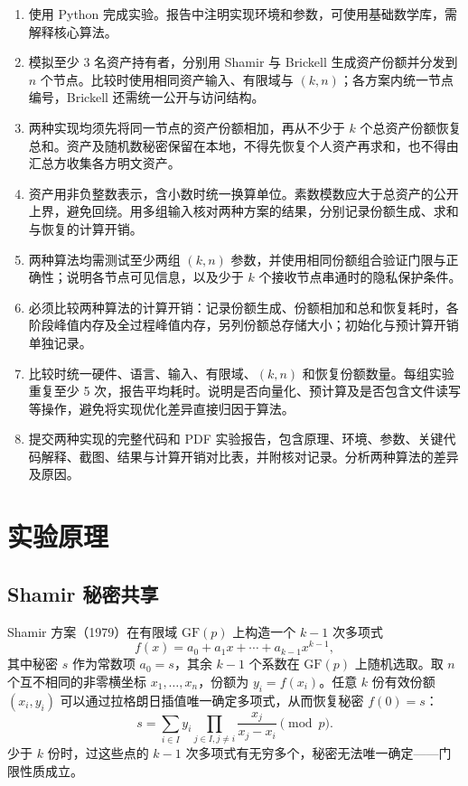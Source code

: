 \documentclass{SYSUReport}
\begin{document}
\begin{enumerate}
    \item 使用 Python 完成实验。报告中注明实现环境和参数，可使用基础数学库，需解释核心算法。
    \item 模拟至少 3 名资产持有者，分别用 Shamir 与 Brickell 生成资产份额并分发到 $n$ 个节点。比较时使用相同资产输入、有限域与 $(k,n)$；各方案内统一节点编号，Brickell 还需统一公开与访问结构。
    \item 两种实现均须先将同一节点的资产份额相加，再从不少于 $k$ 个总资产份额恢复总和。资产及随机数秘密保留在本地，不得先恢复个人资产再求和，也不得由汇总方收集各方明文资产。
    \item 资产用非负整数表示，含小数时统一换算单位。素数模数应大于总资产的公开上界，避免回绕。用多组输入核对两种方案的结果，分别记录份额生成、求和与恢复的计算开销。
    \item 两种算法均需测试至少两组 $(k,n)$ 参数，并使用相同份额组合验证门限与正确性；说明各节点可见信息，以及少于 $k$ 个接收节点串通时的隐私保护条件。
    \item 必须比较两种算法的计算开销：记录份额生成、份额相加和总和恢复耗时，各阶段峰值内存及全过程峰值内存，另列份额总存储大小；初始化与预计算开销单独记录。
    \item 比较时统一硬件、语言、输入、有限域、$(k,n)$ 和恢复份额数量。每组实验重复至少 5 次，报告平均耗时。说明是否向量化、预计算及是否包含文件读写等操作，避免将实现优化差异直接归因于算法。
    \item 提交两种实现的完整代码和 PDF 实验报告，包含原理、环境、参数、关键代码解释、截图、结果与计算开销对比表，并附核对记录。分析两种算法的差异及原因。
\end{enumerate}

\section{实验原理}

\subsection{Shamir 秘密共享}

Shamir 方案（1979）在有限域 $\mathrm{GF}(p)$ 上构造一个 $k-1$ 次多项式
\begin{equation}
    f(x) = a_0 + a_1 x + \cdots + a_{k-1} x^{k-1},
\end{equation}
其中秘密 $s$ 作为常数项 $a_0 = s$，其余 $k-1$ 个系数在 $\mathrm{GF}(p)$ 上随机选取。取 $n$ 个互不相同的非零横坐标 $x_1, \ldots, x_n$，份额为 $y_i = f(x_i)$。任意 $k$ 份有效份额 $(x_i, y_i)$ 可以通过拉格朗日插值唯一确定多项式，从而恢复秘密 $f(0) = s$：
\begin{equation}
    s = \sum_{i \in I} y_i \prod_{j \in I, j \neq i} \frac{x_j}{x_j - x_i} \pmod p.
\end{equation}
少于 $k$ 份时，过这些点的 $k-1$ 次多项式有无穷多个，秘密无法唯一确定——门限性质成立。
\end{document}
